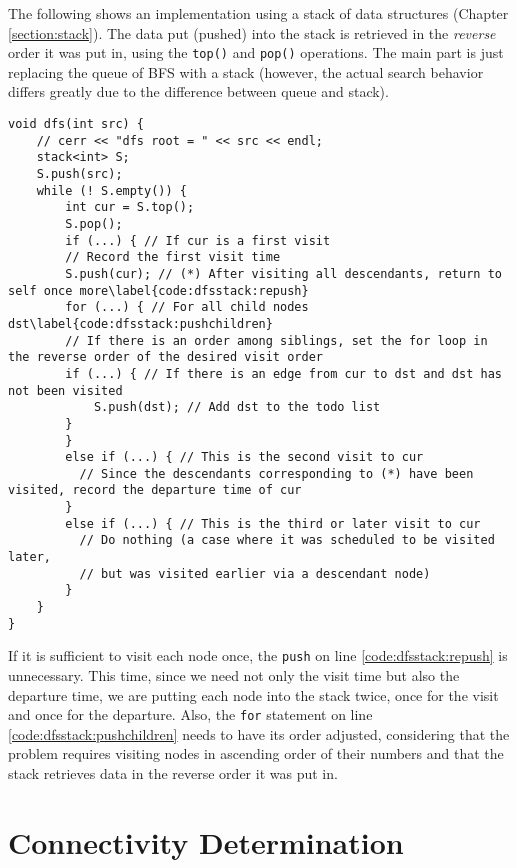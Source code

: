 The following shows an implementation using a stack of data structures (Chapter \ref{section:stack}). The data put (pushed) into the stack is retrieved in the \emph{reverse} order it was put in, using the \texttt{top()} and \texttt{pop()} operations. The main part is just replacing the queue of BFS with a stack (however, the actual search behavior differs greatly due to the difference between queue and stack).

\begin{cbox}[emph={stack,dfs,S}]
\begin{verbatim}
void dfs(int src) {
    // cerr << "dfs root = " << src << endl;
    stack<int> S;
    S.push(src);
    while (! S.empty()) {
        int cur = S.top();
        S.pop();
        if (...) { // If cur is a first visit
	    // Record the first visit time
	    S.push(cur); // (*) After visiting all descendants, return to self once more\label{code:dfsstack:repush}
	    for (...) { // For all child nodes dst\label{code:dfsstack:pushchildren}
		// If there is an order among siblings, set the for loop in the reverse order of the desired visit order
		if (...) { // If there is an edge from cur to dst and dst has not been visited
		    S.push(dst); // Add dst to the todo list
		}
        }
        else if (...) { // This is the second visit to cur
          // Since the descendants corresponding to (*) have been visited, record the departure time of cur
        }
        else if (...) { // This is the third or later visit to cur
          // Do nothing (a case where it was scheduled to be visited later,
          // but was visited earlier via a descendant node)
        }
    }
}
\end{verbatim}
\end{cbox}

If it is sufficient to visit each node once, the \texttt{push} on line \ref{code:dfsstack:repush} is unnecessary. This time, since we need not only the visit time but also the departure time, we are putting each node into the stack twice, once for the visit and once for the departure. Also, the \texttt{for} statement on line \ref{code:dfsstack:pushchildren} needs to have its order adjusted, considering that the problem requires visiting nodes in ascending order of their numbers and that the stack retrieves data in the reverse order it was put in.
\section{Connectivity Determination}

